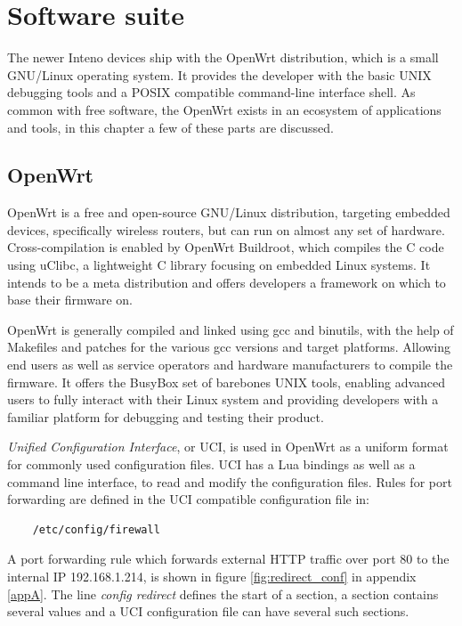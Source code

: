 \documentclass[g5paper,11pt]{kth-bcs}
\begin{document}
\section{Software suite}

The newer Inteno devices ship with the OpenWrt distribution, which is a small GNU/Linux operating system.
It provides the developer with the basic UNIX debugging tools and a POSIX compatible command-line interface shell.
As common with free software, the OpenWrt exists in an ecosystem of applications and tools, in this chapter a few of these parts are discussed.

\subsection{OpenWrt}
OpenWrt is a free and open-source GNU/Linux distribution, targeting embedded devices, specifically wireless routers, but can run on almost any set of hardware.
Cross-compilation is enabled by OpenWrt Buildroot, which compiles the C code using uClibc, a lightweight C library focusing on embedded Linux systems. 
It intends to be a meta distribution and offers developers a framework on which to base their firmware on.

OpenWrt is generally compiled and linked using gcc and binutils, with the help of Makefiles and patches for the various gcc versions and target platforms.
Allowing end users as well as service operators and hardware manufacturers to compile the firmware.
It offers the BusyBox set of barebones UNIX tools, enabling advanced users to fully interact with their Linux system and providing developers with a familiar platform for debugging and testing their product.\cite{OpenWrt:structure_design}

\emph{Unified Configuration Interface}, or UCI, is used in OpenWrt as a uniform format for commonly used configuration files.
UCI has a Lua bindings as well as a command line interface, to read and modify the configuration files.
Rules for port forwarding are defined in the UCI compatible configuration file in:
\begin{verbatim}
    /etc/config/firewall
\end{verbatim}

A port forwarding rule which forwards external HTTP traffic over port 80 to the internal IP 192.168.1.214, is shown in figure \ref{fig:redirect_conf} in appendix \ref{appA}.
The line \emph{config redirect} defines the start of a section, a section contains several values and a UCI configuration file can have several such sections.
\end{document}
